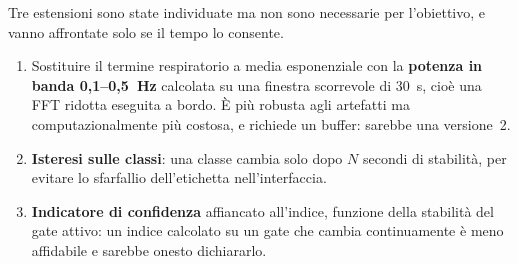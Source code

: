 Tre estensioni sono state individuate ma non sono necessarie per l'obiettivo, e
vanno affrontate solo se il tempo lo consente.

\begin{enumerate}[leftmargin=1.8em,itemsep=2pt]
  \item Sostituire il termine respiratorio a media esponenziale con la
        \textbf{potenza in banda 0,1--0,5~Hz} calcolata su una finestra scorrevole di
        30~s, cioè una FFT ridotta eseguita a bordo. È più robusta agli artefatti ma
        computazionalmente più costosa, e richiede un buffer: sarebbe una versione~2.
  \item \textbf{Isteresi sulle classi}: una classe cambia solo dopo $N$ secondi di
        stabilità, per evitare lo sfarfallio dell'etichetta nell'interfaccia.
  \item \textbf{Indicatore di confidenza} affiancato all'indice, funzione della
        stabilità del gate attivo: un indice calcolato su un gate che cambia
        continuamente è meno affidabile e sarebbe onesto dichiararlo.
\end{enumerate}
